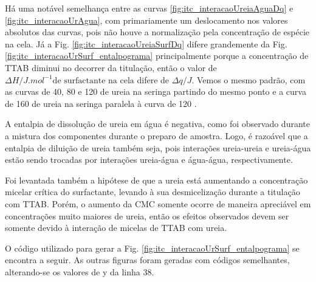 	Há uma notável semelhança entre as curvas \ref{fig:itc_interacaoUreiaAguaDq} e \ref{fig:itc_interacaoUrAgua}, com primariamente um deslocamento nos valores absolutos das curvas, pois não houve a normalização pela concentração de espécie na cela. Já a Fig. \ref{fig:itc_interacaoUreiaSurfDq} difere grandemente da Fig. \ref{fig:itc_interacaoUrSurf_entalpograma} principalmente porque a concentração de TTAB diminui no decorrer da titulação, então o valor de $\Delta H/J.mol^{-1} \text{de surfactante na cela}$ difere de $\Delta q/J$. Vemos o mesmo padrão, com as curvas de 40, 80 e 120 \mM{} de ureia na seringa partindo do mesmo ponto e a curva de 160 \mM{} de ureia na seringa paralela à curva de 120 \mM.
	
	
	A entalpia de dissolução de ureia em água é negativa, como foi observado durante a mistura dos componentes durante o preparo de amostra. Logo, é razoável que a entalpia de diluição de ureia também seja, pois interações ureia-ureia e ureia-água estão sendo trocadas por interações ureia-água e água-água, respectivamente.
	
	
	Foi levantada também a hipótese de que a ureia está aumentando a concentração micelar crítica do surfactante, levando à sua desmicelização durante a titulação com TTAB. Porém, o aumento da CMC somente ocorre de maneira apreciável em concentrações muito maiores de ureia, então os efeitos observados devem ser somente devido à interação de micelas de TTAB com ureia.
	
	O código utilizado para gerar a Fig. \ref{fig:itc_interacaoUrSurf_entalpograma} se encontra a seguir. As outras figuras foram geradas com códigos semelhantes, alterando-se os valores de y da linha 38.
	
